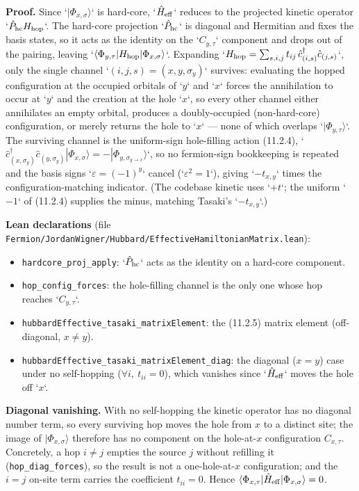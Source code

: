 \documentclass[a4paper,11pt]{article}
\begin{document}
\medskip
\noindent\textbf{Proof.}
Since `\(|\Phi_{x,\sigma}\rangle\)` is hard-core, `\(\hat H_{\rm eff}\)` reduces
to the projected kinetic operator `\(\hat P_{\rm hc} H_{\rm hop}\)`. The hard-core
projection `\(\hat P_{\rm hc}\)` is diagonal and Hermitian and fixes the basis
states, so it acts as the identity on the `\(C_{y,\tau}\)` component and drops
out of the pairing, leaving `\(\langle \Phi_{y,\tau} | H_{\rm hop} | \Phi_{x,\sigma}\rangle\)`.
Expanding `\(H_{\rm hop} = \sum_{s,i,j} t_{ij}\, \hat c^\dagger_{(i,s)}\hat c_{(j,s)}\)`,
only the single channel `\((i,j,s) = (x,y,\sigma_y)\)` survives: evaluating the
hopped configuration at the occupied orbitals of `\(y\)` and `\(x\)` forces the
annihilation to occur at `\(y\)` and the creation at the hole `\(x\)`, so every
other channel either annihilates an empty orbital, produces a doubly-occupied
(non-hard-core) configuration, or merely returns the hole to `\(x\)` — none of
which overlaps `\(|\Phi_{y,\tau}\rangle\)`. The surviving channel is the
uniform-sign hole-filling action (11.2.4), `\(\hat c^\dagger_{(x,\sigma_y)}
\hat c_{(y,\sigma_y)} |\Phi_{x,\sigma}\rangle = -|\Phi_{y,\sigma_{y\to x}}\rangle\)`,
so no fermion-sign bookkeeping is repeated and the basis signs `\(\varepsilon =
(-1)^y\)` cancel (`\(\varepsilon^2 = 1\)`), giving `\(-t_{x,y}\)` times the
configuration-matching indicator. (The codebase kinetic uses `\(+t\)`; the
uniform `\(-1\)` of (11.2.4) supplies the minus, matching Tasaki's `\(-t_{x,y}\)`.)

\medskip
\noindent\textbf{Lean declarations}
(file \texttt{Fermion/JordanWigner/Hubbard/EffectiveHamiltonianMatrix.lean}):
\begin{itemize}
  \item \texttt{hardcore\_proj\_apply}: `\(\hat P_{\rm hc}\)` acts as the identity
    on a hard-core component.
  \item \texttt{hop\_config\_forces}: the hole-filling channel is the only one
    whose hop reaches `\(C_{y,\tau}\)`.
  \item \texttt{hubbardEffective\_tasaki\_matrixElement}: the (11.2.5) matrix
    element (off-diagonal, \(x \neq y\)).
  \item \texttt{hubbardEffective\_tasaki\_matrixElement\_diag}: the diagonal
    (\(x = y\)) case under no self-hopping (\(\forall i,\ t_{ii} = 0\)), which
    vanishes since `\(\hat H_{\rm eff}\)` moves the hole off `\(x\)`.
\end{itemize}

\medskip
\noindent\textbf{Diagonal vanishing.}
With no self-hopping the kinetic operator has no diagonal number term, so every
surviving hop moves the hole from \(x\) to a distinct site; the image of
\(|\Phi_{x,\sigma}\rangle\) therefore has no component on the hole-at-\(x\)
configuration \(C_{x,\tau}\). Concretely, a hop \(i \neq j\) empties the
source \(j\) without refilling it (\texttt{hop\_diag\_forces}), so the result is
not a one-hole-at-\(x\) configuration; and the \(i = j\) on-site term carries the
coefficient \(t_{ii} = 0\). Hence \(\langle \Phi_{x,\tau} | \hat H_{\rm eff}
| \Phi_{x,\sigma}\rangle = 0\).
\end{document}
